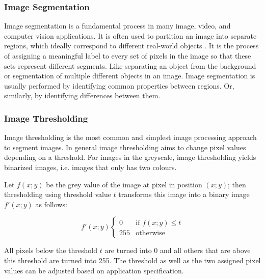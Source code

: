 \subsubsection{Image Segmentation}
Image segmentation is a fundamental process in many image, video, and computer vision applications. It is often used to partition an image into separate regions, which ideally correspond to different real-world objects \parencite{imageSeg}. It is the process of assigning a meaningful label to every set of pixels in the image so that these sets represent different segments. Like separating an object from the background or segmentation of multiple different objects in an image. Image segmentation is usually performed by identifying common properties between regions. Or, similarly, by identifying differences between them.

\subsubsection{Image Thresholding}

Image thresholding is the most common and simplest image processing approach to segment images. In general image thresholding aims to change pixel values depending on a threshold. For images in the greyscale, image thresholding yields binarized images, i.e. images that only has two colours. 

Let $f(x; y)$ be the grey value of the image at pixel in position $(x; y)$; then thresholding using threshold value $t$ transforms this image into a binary image $f'(x; y)$ as follows:

\begin{equation}
\mathcal{} f'(x; y)
  \begin{cases}
    0 & \text{if $f(x; y) \leq t$} \\

    255 & \text{otherwise}
  \end{cases}
\end{equation}

All pixels below the threshold $t$ are turned into 0 and all others that are above this threshold are turned into 255. The threshold as well as the two assigned pixel values can be adjusted based on application specification.

